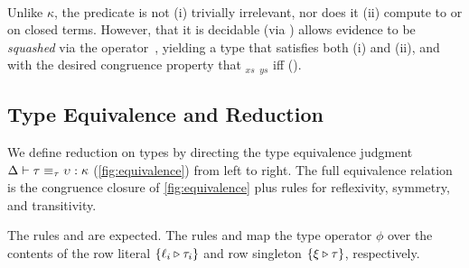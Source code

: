 \documentclass[sigplan,screen]{acmart}
\begin{document}
\begin{AgdaAlign}
\begin{code}%
%
\>[4]\AgdaSpace{}%
\AgdaSymbol{:}%
\>[264I]\AgdaSymbol{(}\AgdaSpace{}%
\AgdaSymbol{:}\AgdaSpace{}%
\AgdaSpace{}%
\AgdaSymbol{(}\AgdaSpace{}%
\AgdaSpace{}%
\AgdaSymbol{))}\AgdaSpace{}%
\AgdaSpace{}%
\AgdaSpace{}%
\AgdaSymbol{(}\AgdaSpace{}%
\AgdaSymbol{)}\AgdaSpace{}%
\<%
\\
\>[.][@{}l@{}]\<[264I]%
\>[10]\AgdaSpace{}%
\AgdaSpace{}%
\AgdaOperator{\AgdaInductiveConstructor{R[}}\AgdaSpace{}%
\AgdaSpace{}%
\AgdaOperator{\AgdaInductiveConstructor{]}}\<%
\end{code}
\end{AgdaAlign}

\Ni Unlike  $\kappa$, the   predicate is not (i) trivially irrelevant, nor does it (ii) compute to  or  on closed terms. However, that it is decidable (via  ) allows evidence to be \emph{squashed} via the  operator~\citep{AgdaStdLib}, yielding a type that satisfies both (i) and (ii), and with the desired congruence property that    $_{xs}$     $_{ys}$ iff    ().

\subsection{Type Equivalence and Reduction}
\label{sec:type-equivalence}




We define reduction on types by directing the type equivalence judgment $\Delta \vdash \tau \equiv_{\tau} \upsilon : \kappa$ (\cref{fig:equivalence}) from left to right. The full equivalence relation is the congruence closure of \cref{fig:equivalence} plus rules for reflexivity, symmetry, and transitivity. 

The rules \erule{$\beta$} and \erule{$\eta$} are expected. The rules  and  map the type operator $\phi$ over the contents of the row literal $\{\ell_i \triangleright \tau_i\}$ and row singleton $\{\xi \triangleright \tau\}$, respectively.
\end{document}
